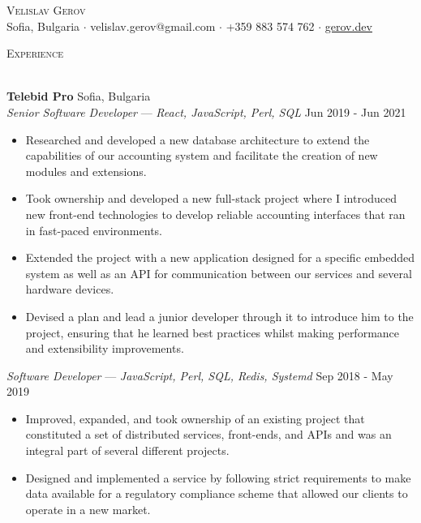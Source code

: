 \documentclass[a4paper]{article}
\newcommand{\lineunder} {
    \vspace*{-8pt} \\
    \hspace*{-18pt} \hrulefill \\
}
\newcommand{\header} [1] {
    {\hspace*{-18pt}\vspace*{6pt} \textsc{#1}}
    \vspace*{-6pt} \lineunder
}
\begin{document}
\vspace*{-40pt}



\vspace*{-10pt}
\begin{center}
    {\Huge \scshape {Velislav Gerov}}\\
    Sofia, Bulgaria $\cdot$ velislav.gerov@gmail.com $\cdot$ +359 883 574 762 $\cdot$  \href{https://gerov.dev}{\underline{gerov.dev}}\\
\end{center}

\header{Experience}
\vspace{1mm}

\textbf{Telebid Pro} \hfill Sofia, Bulgaria\\
\textit{Senior Software Developer}  — {\sl React, JavaScript, Perl, SQL}  \hfill Jun 2019 - Jun 2021\\
\vspace{-1mm}
\begin{itemize} \itemsep 1pt
    \item Researched and developed a new database architecture to extend the capabilities of our accounting system and facilitate the creation of new modules and extensions.
    \item Took ownership and developed a new full-stack project where I introduced new front-end technologies to develop reliable accounting interfaces that ran in fast-paced environments.
    \item Extended the project with a new application designed for a specific embedded system as well as an API for communication between our services and several hardware devices.
    \item Devised a plan and lead a junior developer through it to introduce him to the project, ensuring that he learned best practices whilst making performance and extensibility improvements.
\end{itemize}

\textit{Software Developer}  — {\sl JavaScript, Perl, SQL, Redis, Systemd} \hfill Sep 2018 - May 2019\\
\vspace{-1mm}
\begin{itemize} \itemsep 1pt
    \item Improved, expanded, and took ownership of an existing project that constituted a set of distributed services, front-ends, and APIs and was an integral part of several different projects.
    \item Designed and implemented a service by following strict requirements to make data available for a regulatory compliance scheme that allowed our clients to operate in a new market.
\end{itemize}
\end{document}

